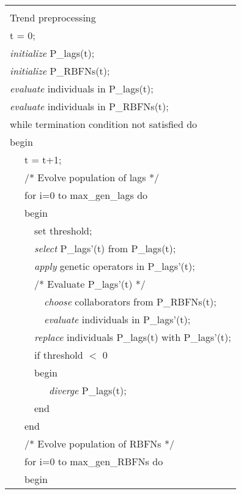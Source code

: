 \documentclass[a4paper,twoside]{article}
\begin{document}
\begin{figure}
\centering
\begin{tabular}{|l|}
\hline
\\
Trend preprocessing \\
t = 0;  \\
\emph{initialize} P\_lags(t); \\
\emph{initialize} P\_RBFNs(t);  \\
\emph{evaluate} individuals in P\_lags(t); \\
\emph{evaluate} individuals in P\_RBFNs(t); \\
while termination condition not satisfied do \\
begin  \\
\ \ \ t = t+1;  \\
\ \ \ /* Evolve population of lags */ \\
\ \ \ for i=0 to max\_gen\_lags do \\
\ \ \ begin  \\
\ \ \ \ \ set threshold;  \\
\ \ \ \ \ \emph{select} P\_lags'(t) from P\_lags(t); \\
\ \ \ \ \ \emph{apply} genetic operators in P\_lags'(t); \\
\ \ \ \ \ /* Evaluate P\_lags'(t) */ \\
\ \ \ \ \ \ \ \emph{choose} collaborators from P\_RBFNs(t); \\
\ \ \ \ \ \ \ \emph{evaluate} individuals in P\_lags'(t); \\
\ \ \ \ \ \emph{replace} individuals P\_lags(t) with P\_lags'(t); \\
\ \ \ \ \ if threshold $<$ 0  \\
\ \ \ \ \ begin  \\
\ \ \ \ \ \ \ \ \emph{diverge} P\_lags(t); \\
\ \ \ \ \ end \\
\ \ \ end  \\
\ \ \ /* Evolve population of RBFNs */ \\
\ \ \ for i=0 to max\_gen\_RBFNs do \\
\ \ \ begin \\

\end{tabular}
\end{figure}
\end{document}

